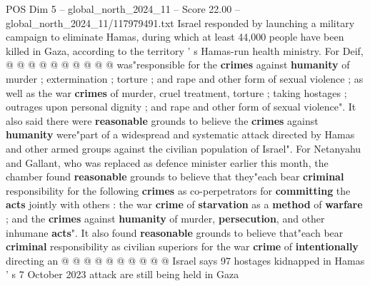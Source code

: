 \begin{textsample}{POS Dim 5 – global\_north\_2024\_11 – Score 22.00 – global\_north\_2024\_11/117979491.txt}
Israel responded by launching a military campaign to eliminate Hamas, during which at least 44,000 people have been killed in Gaza, according to the territory ' s Hamas-run health ministry.
For Deif, @ @ @ @ @ @ @ @ @ @ was"responsible for the \textbf{crimes} against \textbf{humanity} of murder ; extermination ; torture ; and rape and other form of sexual violence ; as well as the war \textbf{crimes} of murder, cruel treatment, torture ; taking hostages ; outrages upon personal dignity ; and rape and other form of sexual violence".
It also said there were \textbf{reasonable} grounds to believe the \textbf{crimes} against \textbf{humanity} were"part of a widespread and systematic attack directed by Hamas and other armed groups against the civilian population of Israel".
For Netanyahu and Gallant, who was replaced as defence minister earlier this month, the chamber found \textbf{reasonable} grounds to believe that they"each bear \textbf{criminal} responsibility for the following \textbf{crimes} as co-perpetrators for \textbf{committing} the \textbf{acts} jointly with others : the war \textbf{crime} of \textbf{starvation} as a \textbf{method} of \textbf{warfare} ; and the \textbf{crimes} against \textbf{humanity} of murder, \textbf{persecution}, and other inhumane \textbf{acts}".
It also found \textbf{reasonable} grounds to believe that"each bear \textbf{criminal} responsibility as civilian superiors for the war \textbf{crime} of \textbf{intentionally} directing an @ @ @ @ @ @ @ @ @ @ Israel says 97 hostages kidnapped in Hamas ' s 7 October 2023 attack are still being held in Gaza

\end{textsample}
